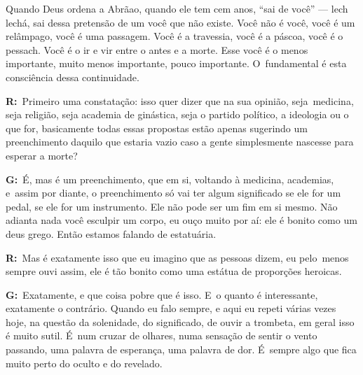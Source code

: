  

Quando Deus ordena a Abrãao, quando ele tem cem anos, ``sai de você''
--- lech lechá, sai dessa pretensão de um você que não existe. Você não
é você, você é um relâmpago, você é uma passagem. Você é a travessia,
você é a páscoa, você é o pessach. Você é o ir e vir entre o antes e a
morte. Esse você é o menos importante, muito menos importante, pouco
importante. O~fundamental é esta consciência dessa continuidade.

 

\textbf{R:}~Primeiro uma constatação: isso quer dizer que na sua
opinião, seja\textbf{}~medicina, seja religião, seja academia de
ginástica, seja o partido político, a ideologia ou o que for,
basicamente todas essas propostas estão apenas sugerindo um
preenchimento daquilo que estaria vazio caso a gente simplesmente
nascesse para esperar a morte?

 

\textbf{G:}~É, mas é um preenchimento, que em si, voltando à medicina,
academias, e\textbf{}~assim por diante, o preenchimento só vai ter algum
significado se ele for um pedal, se ele for um instrumento. Ele não pode
ser um fim em si mesmo. Não adianta nada você esculpir um corpo, eu ouço
muito por aí: ele é bonito como um deus grego. Então estamos falando de
estatuária.

 

\textbf{R:}~Mas é exatamente isso que eu imagino que as pessoas dizem,
eu pelo\textbf{}~menos sempre ouvi assim, ele é tão bonito como uma
estátua de proporções heroicas.

 

\textbf{G:}~Exatamente, e que coisa pobre que é isso. E~o quanto é
interessante, exatamente o contrário. Quando eu falo sempre, e aqui eu
repeti várias vezes hoje, na questão da solenidade, do significado, de
ouvir a trombeta, em geral isso é muito sutil. É~num cruzar de olhares,
numa sensação de sentir o vento passando, uma palavra de esperança, uma
palavra de dor. É~sempre algo que fica muito perto do oculto e do
revelado.%

\fechafala 
